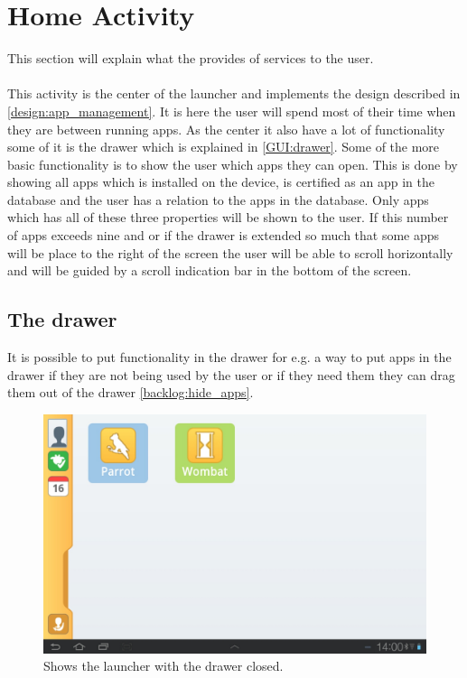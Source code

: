 \section{Home Activity}
This section will explain what the  provides of services to the user.\\\\

This activity is the center of the launcher and implements the design described in \autoref{design:app_management}. It is here the user will spend most of their time when they are between running apps. As the center it also have a lot of functionality some of it is the drawer which is explained in \autoref{GUI:drawer}. 
Some of the more basic functionality is to show the user which apps they can open. This is done by showing all apps which is installed on the device, is certified as an app in the database and the user has a relation to the apps in the database. Only apps which has all of these three properties will be shown to the user. If this number of apps exceeds nine and or if the drawer is extended so much that some apps will be place to the right of the screen the user will be able to scroll horizontally and will be guided by a scroll indication bar in the bottom of the screen.

\subsection{The drawer}
It is possible to put functionality in the drawer for e.g. a way to put apps in the drawer if they are not being used by the user or if they need them they can drag them out of the drawer \autoref{backlog:hide_apps}.

\begin{figure}[h!]
	\centering
	\includegraphics[scale=0.2]{gfx/home-activity_closed}
	\caption{Shows the launcher with the drawer closed.}
	\label{fig:home-activity_closed}
\end{figure}


